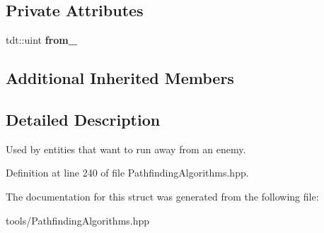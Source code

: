 \subsection*{Private Attributes}
\begin{DoxyCompactItemize}
\item 
tdt\+::uint {\bfseries from\+\_\+}\hypertarget{structutil_1_1heuristic_1_1_r_u_n___a_w_a_y___h_e_u_r_i_s_t_i_c_a6db40574c55d644ee87513ddcbb0c69a}{}\label{structutil_1_1heuristic_1_1_r_u_n___a_w_a_y___h_e_u_r_i_s_t_i_c_a6db40574c55d644ee87513ddcbb0c69a}

\end{DoxyCompactItemize}
\subsection*{Additional Inherited Members}


\subsection{Detailed Description}
Used by entities that want to run away from an enemy. 

Definition at line 240 of file Pathfinding\+Algorithms.\+hpp.



The documentation for this struct was generated from the following file\+:\begin{DoxyCompactItemize}
\item 
tools/Pathfinding\+Algorithms.\+hpp\end{DoxyCompactItemize}
